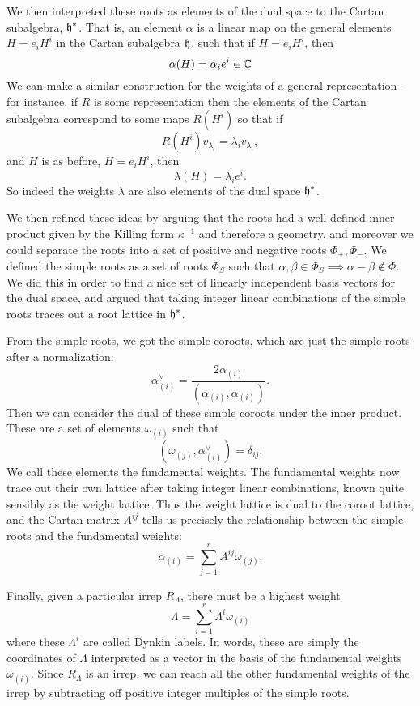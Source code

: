 We then interpreted these roots as elements of the dual space to the Cartan subalgebra, $\mathfrak{h}^*$. That is, an element $\alpha$ is a linear map on the general elements $H=e_i H^i$ in the Cartan subalgebra $\mathfrak{h}$, such that if $H=e_i H^i$, then $$\alpha(H)=\alpha_i e^i \in \mathbb{C}$$ We can make a similar construction for the weights of a general representation-- for instance, if $R$ is some representation then the elements of the Cartan subalgebra correspond to some maps $R(H^i)$ so that if
$$R(H^i)v_{\lambda_i}=\lambda_i v_{\lambda_i},$$
and $H$ is as before, $H=e_i H^i$, then $$\lambda(H)=\lambda_i e^i.$$
So indeed the weights $\lambda$ are also elements of the dual space $\mathfrak{h}^*$.

We then refined these ideas by arguing that the roots had a well-defined inner product given by the Killing form $\kappa^{-1}$ and therefore a geometry, and moreover we could separate the roots into a set of positive and negative roots $\Phi_+,\Phi_-$. We defined the simple roots as a set of roots $\Phi_S$ such that $\alpha,\beta\in \Phi_S\implies \alpha-\beta \notin \Phi$. We did this in order to find a nice set of linearly independent basis vectors for the dual space, and argued that taking integer linear combinations of the simple roots traces out a root lattice in $\mathfrak{h}^*$.

From the simple roots, we got the simple coroots, which are just the simple roots after a normalization:
$$\alpha^\vee_{(i)}=\frac{2\alpha_{(i)}}{(\alpha_{(i)},\alpha_{(i)})}.$$ Then we can consider the dual of these simple coroots under the inner product. These are a set of elements $\omega_{(i)}$ such that
$$(\omega_{(j)},\alpha^\vee_{(i)})=\delta_{ij}.$$ We call these elements the fundamental weights. The fundamental weights now trace out their own lattice after taking integer linear combinations, known quite sensibly as the weight lattice. Thus the weight lattice is dual to the coroot lattice, and the Cartan matrix $A^{ij}$ tells us precisely the relationship between the simple roots and the fundamental weights:
$$\alpha_{(i)}=\sum_{j=1}^r A^{ij}\omega_{(j)}.$$

Finally, given a particular irrep $R_\Lambda$, there must be a highest weight
$$\Lambda=\sum_{i=1}^r \Lambda^i \omega_{(i)}$$
where these $\Lambda^i$ are called Dynkin labels. In words, these are simply the coordinates of $\Lambda$ interpreted as a vector in the basis of the fundamental weights $\omega_{(i)}$. Since $R_\Lambda$ is an irrep, we can reach all the other fundamental weights of the irrep by subtracting off positive integer multiples of the simple roots.